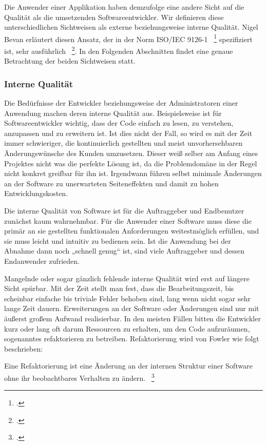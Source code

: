 Die Anwender einer Applikation haben demzufolge eine andere Sicht auf die Qualität als die umsetzenden Softwareentwickler. Wir definieren diese unterschiedlichen Sichtweisen als externe beziehungsweise interne Qualität. Nigel Bevan erläutert diesen Ansatz, der in der Norm ISO/IEC 9126-1 ~\footcite[]{ISOIEC91261} spezifiziert ist, sehr ausführlich ~\footcite[]{Bevan.1999}. In den Folgenden Abschnitten findet eine genaue Betrachtung der beiden Sichtweisen statt.

\subsubsection{Interne Qualität}
Die Bedürfnisse der Entwickler beziehungsweise der Administratoren einer Anwendung machen deren interne Qualität aus. Beispielsweise ist für Softwareentwickler wichtig, dass der Code einfach zu lesen, zu verstehen, anzupassen und zu erweitern ist. Ist dies nicht der Fall, so wird es mit der Zeit immer schwieriger, die kontinuierlich gestellten und meist unvorhersehbaren Änderungswünsche des Kunden umzusetzen. Dieser weiß selber am Anfang eines Projektes nicht was die perfekte Lösung ist, da die Problemdomäne in der Regel nicht konkret greifbar für ihn ist. Irgendwann führen selbst minimale Änderungen an der Software zu unerwarteten Seiteneffekten und damit zu hohen Entwicklungskosten.

Die interne Qualität von Software ist für die Auftraggeber und Endbenutzer zunächst kaum wahrnehmbar. Für die Anwender einer Software muss diese die primär an sie gestellten funktionalen Anforderungen weitestmöglich erfüllen, und sie muss leicht und intuitiv zu bedienen sein. Ist die Anwendung bei der Abnahme dann noch „schnell genug“ ist, sind viele Auftraggeber und dessen Endanwender zufrieden.

Mangelnde oder sogar gänzlich fehlende interne Qualität wird erst auf längere Sicht spürbar. Mit der Zeit stellt man fest, dass die Bearbeitungszeit, bis scheinbar einfache bis triviale Fehler behoben sind, lang wenn nicht sogar sehr lange Zeit dauern. Erweiterungen an der Software oder Änderungen sind nur mit äußerst großem Aufwand realisierbar. In den meisten Fällen bitten die Entwickler kurz oder lang oft darum Ressourcen zu erhalten, um den Code aufzuräumen, sogenanntes refaktorieren zu betreiben. Refaktorierung wird von Fowler wie folgt beschrieben: 

\dq{}Eine Refaktorierung ist eine Änderung an der internen Struktur einer Software ohne ihr beobachtbares Verhalten zu ändern.\dq{} ~\footcite[Seite xviii]{Fowler.2000}

